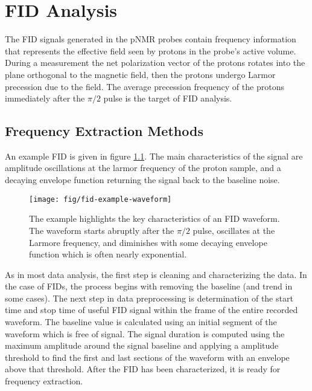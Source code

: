 \chapter{FID Analysis} \label{ch:fid-analysis}

The FID signals generated in the pNMR probes contain frequency information that represents the effective field seen by protons in the probe's active volume.  During a measurement the net polarization vector of the protons rotates into the plane orthogonal to the magnetic field, then the protons undergo Larmor precession due to the field.  The average precession frequency of the protons immediately after the $\pi/2$ pulse is the target of FID analysis.

\section{Frequency Extraction Methods}

An example FID is given in figure \ref{fig:fid-example-waveform}.  The main characteristics of the signal are amplitude oscillations at the larmor frequency of the proton sample, and a decaying envelope function returning the signal back to the baseline noise.

\begin{figure}
\centering
\texttt{[image: fig/fid-example-waveform]}
\caption{
    The example highlights the key characteristics of an FID waveform.  The waveform starts abruptly after the $\pi/2$ pulse, oscillates at the Larmore frequency, and diminishes with some decaying envelope function which is often nearly exponential.
    \label{fig:fid-example-waveform}
}
\end{figure}

\noindent
As in most data analysis, the first step is cleaning and characterizing the data.  In the case of FIDs, the process begins with removing the baseline (and trend in some cases).  The next step in data preprocessing is determination of the start time and stop time of useful FID signal within the frame of the entire recorded waveform.  The baseline value is calculated using an initial segment of the waveform which is free of signal.  The signal duration is computed using the maximum amplitude around the signal baseline and applying a amplitude threshold to find the first and last sections of the waveform with an envelope above that threshold.  After the FID has been characterized, it is ready for frequency extraction.


